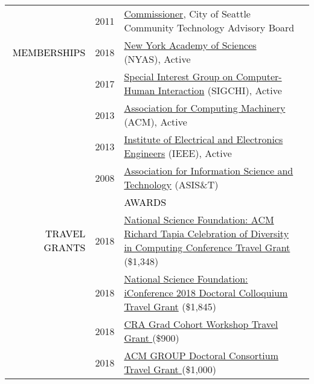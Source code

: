 \documentclass[12pt]{article}
\begin{document}
{{\begin{longtable}{Rp{1.0in}p{0.25in}p{4.75in}}
& \footnotesize{2011} & \href{https://web.archive.org/web/20150911093548/https://ischool.uw.edu/alumni/impact-stories/informatics-grad-and-husky-promise-student-aims-deliver-it-resources}{{Commissioner}}, City of Seattle Community Technology Advisory Board \\

\textcolor{black}{\footnotesize{\uppercase{Memberships}}} & \footnotesize{2018} & \href{https://www.nyas.org/}{{New York Academy of Sciences}} (NYAS), Active \\

 & \footnotesize{2017} & \href{http://www.sigchi.org/}{{Special Interest Group on Computer-Human Interaction}} (SIGCHI), Active \\

& \footnotesize{2013} & \href{https://www.acm.org/}{{Association for Computing Machinery}} (ACM), Active \\

& \footnotesize{2013} & \href{https://www.ieee.org/}{{Institute of Electrical and Electronics Engineers}} (IEEE), Active \\

& \footnotesize{2008} & \href{https://www.asist.org/}{{Association for Information Science and Technology}} (ASIS\&T)
\bigskip \\

&&\par \Large \textcolor{black}{\uppercase{Awards}}\\ \hhline{~~-}

\textcolor{black}{\footnotesize{\uppercase{Travel Grants}}} & \footnotesize{2018} & \href{https://www.nsf.gov/awardsearch/showAward?AWD_ID=1823052}{{National Science Foundation: ACM Richard Tapia Celebration of Diversity in Computing Conference Travel Grant}} (\$1,348) \\

& \footnotesize{2018} & \href{https://www.nsf.gov/awardsearch/showAward?AWD_ID=1713738}{{National Science Foundation: iConference 2018 Doctoral Colloquium Travel Grant}} (\$1,845) \\

& \footnotesize{2018} & \href{https://cra.org/events/urmgradcohort/}{{CRA Grad Cohort Workshop Travel Grant} }(\$900) \\

& \footnotesize{2018} & \href{https://dl.acm.org/citation.cfm?id=3148330}{{ACM GROUP Doctoral Consortium Travel Grant} }(\$1,000) \\


\end{longtable}}}
\end{document}
